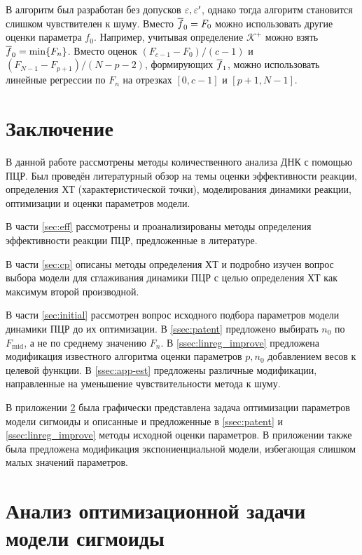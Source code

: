В \cite{orekhovUnsupervisedMachineLearning2023} алгоритм был разработан без
допусков $\varepsilon,\varepsilon'$, однако тогда алгоритм становится слишком чувствителен к
шуму. Вместо $\overline{f}_0=F_0$ можно использовать другие оценки параметра $f_0$.
Например, учитывая определение $\mathcal K^{+}$ можно взять
$\overline{f}_0=\min\{F_{n}\}$. Вместо оценок $(F_{c-1}-F_0)/(c-1)$ и
$(F_{N-1}-F_{p+1})/(N-p-2)$, формирующих $\overline{f}_1$, можно использовать
линейные регрессии по $F_{n}$ на отрезках $[0,c-1]$ и $[p+1,N-1]$.

\section{Заключение}

В данной работе рассмотрены методы количественного анализа ДНК с помощью
ПЦР. Был проведён литературный обзор на темы оценки эффективности реакции,
определения ХТ (характеристической точки), моделирования динамики реакции,
оптимизации и оценки параметров модели.

В части \ref{sec:eff} рассмотрены и проанализированы методы определения
эффективности реакции ПЦР, предложенные в литературе.

В части \ref{sec:cp} описаны методы определения ХТ и подробно изучен вопрос
выбора модели для сглаживания динамики ПЦР с целью определения ХТ как максимум
второй производной.

В части \ref{sec:initial} рассмотрен вопрос исходного подбора параметров модели
динамики ПЦР до их оптимизации. В \ref{ssec:patent} предложено выбирать $n_0$
по $F_{\text{mid}}$, а не по среднему значению $F_{n}$. В
\ref{ssec:linreg_improve} предложена модификация известного алгоритма оценки
параметров $p,n_0$ добавлением весов к целевой функции. В \ref{ssec:app-est}
предложены различные модификации, направленные на уменьшение чувствительности
метода к шуму.

В приложении \ref{app:opt_an} была графически представлена задача оптимизации
параметров модели сигмоиды и описанные и предложенные в \ref{ssec:patent} и
\ref{ssec:linreg_improve} методы исходной оценки параметров. В приложении также
была предложена модификация экспониенциальной модели, избегающая слишком малых
значений параметров.

\newpage

\showbib{}

\newpage

\appendix{}

\section{Анализ оптимизационной задачи модели сигмоиды}\label{app:opt_an}

